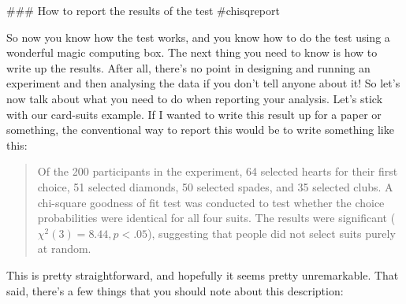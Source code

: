 ### How to report the results of the test {#chisqreport}

So now you know how the test works, and you know how to do the test using a wonderful magic computing box. The next thing you need to know is how to write up the results. After all, there's no point in designing and running an experiment and then analysing the data if you don't tell anyone about it! So let's now talk about what you need to do when reporting your analysis. Let's stick with our card-suits example. If I wanted to write this result up for a paper or something, the conventional way to report this would be to write something like this:

\begin{quote}
Of the 200 participants in the experiment, 64 selected hearts for their first choice, 51 selected diamonds, 50 selected spades, and 35 selected clubs. A chi-square goodness of fit test was conducted to test whether the choice probabilities were identical for all four suits. The results were significant ($\chi^2(3) = 8.44, p<.05$), suggesting that people did not select suits purely at random.
\end{quote}




This is pretty straightforward, and hopefully it seems pretty unremarkable. That said, there's a few things that you should note about this description:

